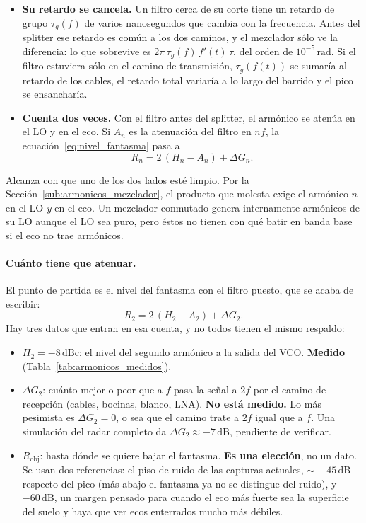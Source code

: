 \documentclass[12pt, a4paper, twoside]{report}
\begin{document}
\begin{itemize}
  \item \textbf{Su retardo se cancela.} Un filtro cerca de su corte tiene un
    retardo de grupo $\tau_g(f)$ de varios nanosegundos que cambia con la
    frecuencia. Antes del splitter ese retardo es común a los dos caminos, y
    el mezclador sólo ve la diferencia: lo que sobrevive es
    $2\pi\,\tau_g(f)\,f'(t)\,\tau$, del orden de $10^{-5}\,\text{rad}$. Si el
    filtro estuviera sólo en el camino de transmisión, $\tau_g(f(t))$ se
    sumaría al retardo de los cables, el retardo total variaría a lo largo
    del barrido y el pico se ensancharía.
  \item \textbf{Cuenta dos veces.} Con el filtro antes del splitter, el
    armónico se atenúa en el LO y en el eco. Si $A_n$ es la atenuación del
    filtro en $n f$, la ecuación~\eqref{eq:nivel_fantasma} pasa a
    \begin{equation}
      R_n = 2\,(H_n - A_n) + \Delta G_n .
    \end{equation}
\end{itemize}

Alcanza con que uno de los dos lados esté limpio. Por la
Sección~\ref{sub:armonicos_mezclador}, el producto que molesta exige el
armónico $n$ en el LO \emph{y} en el eco. Un mezclador conmutado genera
internamente armónicos de su LO aunque el LO sea puro, pero éstos no tienen
con qué batir en banda base si el eco no trae armónicos.

\paragraph{Cuánto tiene que atenuar.} El punto de partida es el nivel del
fantasma con el filtro puesto, que se acaba de escribir:
\begin{equation*}
  R_2 = 2\,(H_2 - A_2) + \Delta G_2 .
\end{equation*}
Hay tres datos que entran en esa cuenta, y no todos tienen el mismo
respaldo:
\begin{itemize}
  \item $H_2 = -8\,\text{dBc}$: el nivel del segundo armónico a la salida
    del VCO. \textbf{Medido} (Tabla~\ref{tab:armonicos_medidos}).
  \item $\Delta G_2$: cuánto mejor o peor que a $f$ pasa la señal a $2f$ por
    el camino de recepción (cables, bocinas, blanco, LNA). \textbf{No está
    medido.} Lo más pesimista es $\Delta G_2 = 0$, o sea que el camino trate
    a $2f$ igual que a $f$. Una simulación del radar completo da
    $\Delta G_2 \approx -7\,\text{dB}$, pendiente de verificar.
  \item $R_\text{obj}$: hasta dónde se quiere bajar el fantasma. \textbf{Es
    una elección}, no un dato. Se usan dos referencias: el piso de ruido de
    las capturas actuales, $\sim\!-45\,\text{dB}$ respecto del pico (más
    abajo el fantasma ya no se distingue del ruido), y $-60\,\text{dB}$,
    un margen pensado para cuando el eco más fuerte sea la superficie del
    suelo y haya que ver ecos enterrados mucho más débiles.
\end{itemize}
\end{document}
